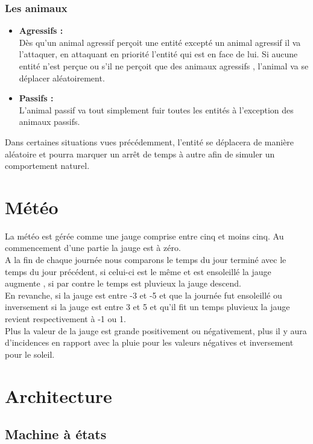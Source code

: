 \documentclass[a4paper]{memoir}
\begin{document}
				\subsubsection{Les animaux}
					\begin{itemize}[label=$\bullet$]
						\item \textbf{Agressifs :} \\
							Dès qu'un animal agressif perçoit une entité excepté un animal agressif il va l'attaquer, en attaquant en priorité l'entité qui est en face de lui. Si aucune entité n'est perçue ou s'il ne perçoit que des animaux agressifs , l'animal va se déplacer aléatoirement.
						\item \textbf{Passifs :} \\
							L'animal passif va tout simplement fuir toutes les entités à l'exception des animaux passifs.
					\end{itemize} \normalsize 

				Dans certaines situations vues précédemment, l’entité se déplacera de manière aléatoire et pourra marquer un arrêt de temps à autre afin de simuler un comportement naturel.
	
		\section{Météo}
			La météo est gérée comme une jauge comprise entre cinq et moins cinq. Au commencement d'une partie la jauge est à zéro.\\
			A la fin de chaque journée nous comparons le temps du jour terminé avec le temps du jour précédent, si celui-ci est le même    et est ensoleillé la jauge augmente , si par contre le temps est pluvieux la jauge descend.\\
			En revanche, si la jauge est entre -3 et -5 et que la journée fut ensoleillé ou inversement si la jauge est entre 3 et 5 et qu'il fit un temps pluvieux la jauge revient respectivement à -1 ou 1.\\
			Plus la valeur de la jauge est grande positivement ou négativement, plus il y aura d'incidences en rapport avec la pluie pour les valeurs négatives et inversement pour le soleil.
	
		\section{Architecture}
		
			\subsection{Machine à états}
			
\end{document}
